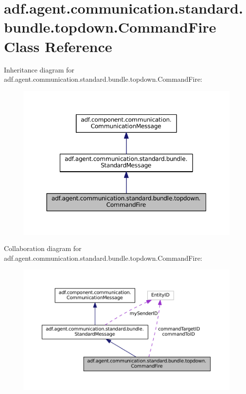 \hypertarget{classadf_1_1agent_1_1communication_1_1standard_1_1bundle_1_1topdown_1_1CommandFire}{}\section{adf.\+agent.\+communication.\+standard.\+bundle.\+topdown.\+Command\+Fire Class Reference}
\label{classadf_1_1agent_1_1communication_1_1standard_1_1bundle_1_1topdown_1_1CommandFire}


Inheritance diagram for adf.\+agent.\+communication.\+standard.\+bundle.\+topdown.\+Command\+Fire\+:
\nopagebreak
\begin{figure}[H]
\begin{center}
\leavevmode
\includegraphics[width=350pt]{classadf_1_1agent_1_1communication_1_1standard_1_1bundle_1_1topdown_1_1CommandFire__inherit__graph}
\end{center}
\end{figure}


Collaboration diagram for adf.\+agent.\+communication.\+standard.\+bundle.\+topdown.\+Command\+Fire\+:
\nopagebreak
\begin{figure}[H]
\begin{center}
\leavevmode
\includegraphics[width=350pt]{classadf_1_1agent_1_1communication_1_1standard_1_1bundle_1_1topdown_1_1CommandFire__coll__graph}
\end{center}
\end{figure}

